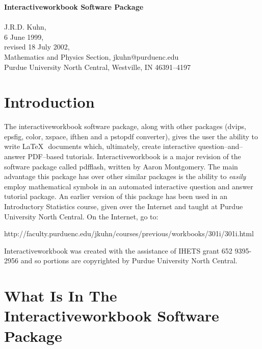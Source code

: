 \documentclass[12pt]{article}
\begin{document}
\noindent
{\LARGE\bf Interactiveworkbook Software Package} \\ \\
{J.R.D. Kuhn}, \\
{6 June 1999}, \\
{revised 18 July 2002}, \\
{Mathematics and Physics Section}, {jkuhn@purduenc.edu} \\
{Purdue University North Central, Westville, IN 46391--4197}


\section{Introduction}

\noindent The interactiveworkbook software package, along with
other packages (dvips, epsfig, color, xspace, ifthen and a pstopdf
converter), gives the user the ability to write \LaTeX\,\,
documents which, ultimately, create interactive
question--and--answer PDF--based tutorials. Interactiveworkbook is
a major revision of the software package called pdfflash, written
by Aaron Montgomery.  The main advantage this package has over
other similar packages is the ability to {\it easily} employ
mathematical symbols in an automated interactive question and
answer tutorial package.  An earlier version of this package has
been used in an Introductory Statistics course, given over the
Internet and taught at Purdue University North Central.  On the
Internet, go to:
\begin{center}
    http://faculty.purduenc.edu/jkuhn/courses/previous/workbooks/301i/301i.html
\end{center}
Interactiveworkbook was created with the assistance of IHETS grant
652 9395-2956 and so portions are copyrighted by Purdue University
North Central.

\section{What Is In The Interactiveworkbook Software Package}
\end{document}
